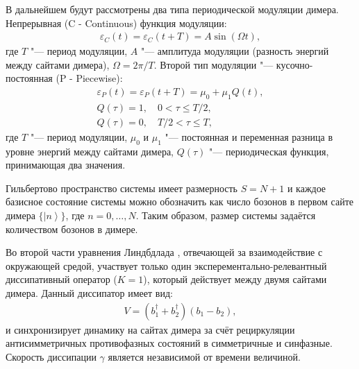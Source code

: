 В дальнейшем будут рассмотрены два типа периодической модуляции димера.
Непрерывная (C - Continuous) функция модуляции:
\begin{equation}
	\label{eq:dimer_mod_c}
	\begin{gathered}
		\varepsilon_{C}(t) = \varepsilon_{C}(t + T) = A \sin(\Omega t),
	\end{gathered}
\end{equation}
где \(T\) "--- период модуляции, \(A\) "--- амплитуда модуляции (разность энергий между сайтами димера), \(\Omega = 2 \pi / T\).
Второй тип модуляции "--- кусочно-постоянная (P - Piecewise):
\begin{equation}
	\label{eq:dimer_mod_p}
	\begin{gathered}
		\varepsilon_{P}(t) = \varepsilon_{P}(t + T) = \mu_0 + \mu_1 Q(t), \\
		Q(\tau) = 1, \quad 0 < \tau \le T/2, \\
		Q(\tau) = 0, \quad T/2 < \tau \le T,
	\end{gathered}
\end{equation}
где \(T\) "--- период модуляции, \(\mu_0\) и \(\mu_1\) "--- постоянная и переменная разница в уровне энергий между сайтами димера, \(Q(\tau)\) "--- периодическая функция, принимающая два значения.

Гильбертово пространство системы имеет размерность \(S = N + 1\) и каждое базисное состояние системы можно обозначить как число бозонов в первом сайте димера \( \lbrace \left|n\right>\rbrace\), где \(n = 0,\ldots,N\). Таким образом, размер системы задаётся количеством бозонов в димере.

Во второй части уравнения Линдбдлада , отвечающей за взаимодействие с окружающей средой, участвует только один эксперементально-релевантный \cite{Diehl2008, Kraus2008} диссипативный оператор (\(K=1\)), который действует между двумя сайтами димера. Данный диссипатор имеет вид:
\begin{equation}
	\label{eq:dimer_diss}
	\begin{gathered}
		V = ( b^\dagger_1 + b^\dagger_2) \left( b_1 - b_2 \right),
	\end{gathered}
\end{equation}
и синхронизирует динамику на сайтах димера за счёт рециркуляции антисимметричных противофазных состояний в симметричные и синфазные. Скорость диссипации \(\gamma\) является независимой от времени величиной.

